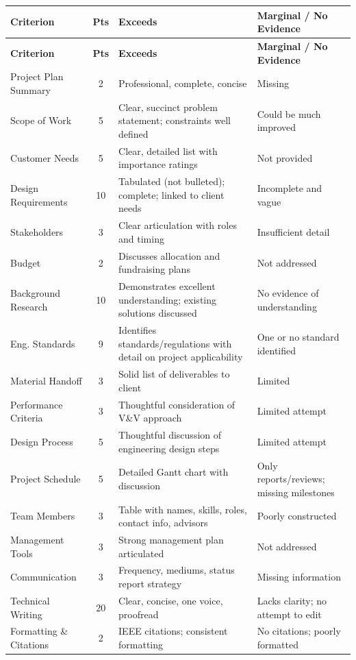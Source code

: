 {\small
\begin{longtable}{p{3.5cm} c p{4cm} p{4cm}}
\toprule
\textbf{Criterion} & \textbf{Pts} & \textbf{Exceeds} & \textbf{Marginal / No Evidence} \\
\midrule
\endfirsthead
\toprule
\textbf{Criterion} & \textbf{Pts} & \textbf{Exceeds} & \textbf{Marginal / No Evidence} \\
\midrule
\endhead
\bottomrule
\endfoot

Project Plan Summary & 2 & Professional, complete, concise & Missing \\
\addlinespace
Scope of Work & 5 & Clear, succinct problem statement; constraints well defined & Could be much improved \\
\addlinespace
Customer Needs & 5 & Clear, detailed list with importance ratings & Not provided \\
\addlinespace
Design Requirements & 10 & Tabulated (not bulleted); complete; linked to client needs & Incomplete and vague \\
\addlinespace
Stakeholders & 3 & Clear articulation with roles and timing & Insufficient detail \\
\addlinespace
Budget & 2 & Discusses allocation and fundraising plans & Not addressed \\
\addlinespace
Background Research & 10 & Demonstrates excellent understanding; existing solutions discussed & No evidence of understanding \\
\addlinespace
Eng. Standards & 9 & Identifies standards/regulations with detail on project applicability & One or no standard identified \\
\addlinespace
Material Handoff & 3 & Solid list of deliverables to client & Limited \\
\addlinespace
Performance Criteria & 3 & Thoughtful consideration of V\&V approach & Limited attempt \\
\addlinespace
Design Process & 5 & Thoughtful discussion of engineering design steps & Limited attempt \\
\addlinespace
Project Schedule & 5 & Detailed Gantt chart with discussion & Only reports/reviews; missing milestones \\
\addlinespace
Team Members & 3 & Table with names, skills, roles, contact info, advisors & Poorly constructed \\
\addlinespace
Management Tools & 3 & Strong management plan articulated & Not addressed \\
\addlinespace
Communication & 3 & Frequency, mediums, status report strategy & Missing information \\
\addlinespace
Technical Writing & 20 & Clear, concise, one voice, proofread & Lacks clarity; no attempt to edit \\
\addlinespace
Formatting \& Citations & 2 & IEEE citations; consistent formatting & No citations; poorly formatted \\

\end{longtable}
}

